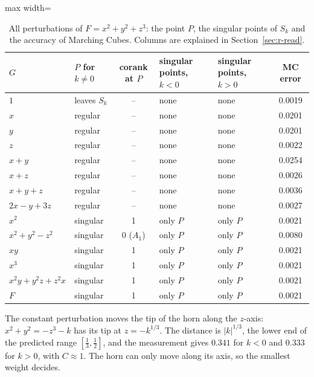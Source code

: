 \documentclass[12pt, a4paper, oneside]{book}
\theoremstyle{plain}
\theoremstyle{definition}
\theoremstyle{remark}
\theoremstyle{definition}
\begin{document}
\begin{table}[!h]
\centering
\footnotesize
\begin{adjustbox}{max width=\textwidth}
\begin{tabular}{l l c l l c}
\toprule
$G$ & $P$ for $k\neq0$ & corank at $P$ & singular points, $k<0$ & singular points, $k>0$ & MC error \\
\midrule
$1$ & leaves $S_k$ & -- & none & none & 0.0019 \\
$x$ & regular & -- & none & none & 0.0201 \\
$y$ & regular & -- & none & none & 0.0201 \\
$z$ & regular & -- & none & none & 0.0022 \\
$x+y$ & regular & -- & none & none & 0.0254 \\
$x+z$ & regular & -- & none & none & 0.0026 \\
$x+y+z$ & regular & -- & none & none & 0.0036 \\
$2x-y+3z$ & regular & -- & none & none & 0.0027 \\
$x^2$ & singular & 1 & only $P$ & only $P$ & 0.0021 \\
$x^2+y^2-z^2$ & singular & 0 ($A_1$) & only $P$ & only $P$ & 0.0080 \\
$xy$ & singular & 1 & only $P$ & only $P$ & 0.0021 \\
$x^3$ & singular & 1 & only $P$ & only $P$ & 0.0021 \\
$x^2y+y^2z+z^2x$ & singular & 1 & only $P$ & only $P$ & 0.0021 \\
$F$ & singular & 1 & only $P$ & only $P$ & 0.0021 \\
\bottomrule
\end{tabular}
\end{adjustbox}
\caption[Singular points for $x^2+y^2+z^3$]{All perturbations of $F=x^2+y^2+z^3$: the point $P$, the singular points of $S_k$ and the accuracy of Marching Cubes. Columns are explained in Section~\ref{sec:r-read}.}
\label{tab:r-A2a-points}
\end{table}

The constant perturbation moves the tip of the horn along the $z$-axis: $x^2+y^2=-z^3-k$ has its tip at $z=-k^{1/3}$. The distance is $|k|^{1/3}$, the lower end of the predicted range $[\tfrac13,\tfrac12]$, and the measurement gives $0.341$ for $k<0$ and $0.333$ for $k>0$, with $C\approx1$. The horn can only move along its axis, so the smallest weight decides.
\end{document}
